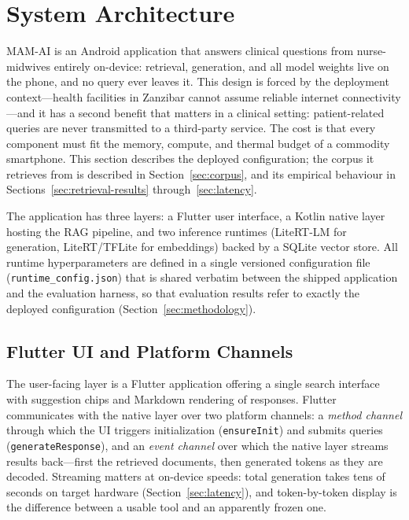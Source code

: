\section{System Architecture}
\label{sec:architecture}


MAM-AI is an Android application that answers clinical questions from
nurse-midwives entirely on-device: retrieval, generation, and all model
weights live on the phone, and no query ever leaves it. This design is
forced by the deployment context---health facilities in Zanzibar cannot
assume reliable internet connectivity---and it has a second benefit that
matters in a clinical setting: patient-related queries are never
transmitted to a third-party service. The cost is that every component
must fit the memory, compute, and thermal budget of a commodity
smartphone. This section describes the deployed configuration; the
corpus it retrieves from is described in Section~\ref{sec:corpus}, and
its empirical behaviour in Sections~\ref{sec:retrieval-results}
through~\ref{sec:latency}.

The application has three layers: a Flutter user interface, a Kotlin
native layer hosting the RAG pipeline, and two inference runtimes
(LiteRT-LM for generation, LiteRT/TFLite for embeddings) backed by a
SQLite vector store. All runtime hyperparameters are defined in a single
versioned configuration file (\texttt{runtime\_config.json}) that is
shared verbatim between the shipped application and the evaluation
harness, so that evaluation results refer to exactly the deployed
configuration (Section~\ref{sec:methodology}).

\subsection{Flutter UI and Platform Channels}

The user-facing layer is a Flutter application offering a single search
interface with suggestion chips and Markdown rendering of responses.
Flutter communicates with the native layer over two platform channels: a
\emph{method channel} through which the UI triggers initialization
(\texttt{ensureInit}) and submits queries (\texttt{generateResponse}),
and an \emph{event channel} over which the native layer streams results
back---first the retrieved documents, then generated tokens as they are
decoded. Streaming matters at on-device speeds: total generation takes
tens of seconds on target hardware (Section~\ref{sec:latency}), and
token-by-token display is the difference between a usable tool and an
apparently frozen one.

